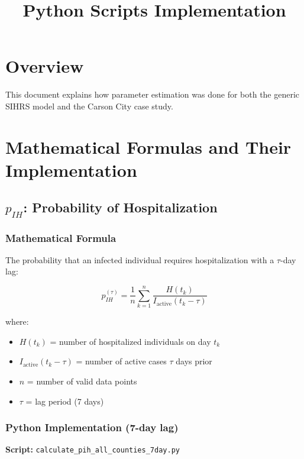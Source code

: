 \documentclass[11pt]{article}
\title{Python Scripts Implementation}
\author{}
\date{}
\begin{document}
\maketitle

\section{Overview}

This document explains how parameter estimation was done for both the generic SIHRS model and the Carson City case study.

\section{Mathematical Formulas and Their Implementation}

\subsection{$p_{IH}$: Probability of Hospitalization}

\subsubsection{Mathematical Formula}
The probability that an infected individual requires hospitalization with a $\tau$-day lag:

\[
p_{IH}^{(\tau)} = \frac{1}{n} \sum_{k=1}^{n} \frac{H(t_k)}{I_{\text{active}}(t_k - \tau)}
\]

where:
\begin{itemize}
    \item $H(t_k)$ = number of hospitalized individuals on day $t_k$
    \item $I_{\text{active}}(t_k - \tau)$ = number of active cases $\tau$ days prior
    \item $n$ = number of valid data points
    \item $\tau$ = lag period (7 days)
\end{itemize}

\subsubsection{Python Implementation (7-day lag)}
\textbf{Script:} \texttt{calculate\_pih\_all\_counties\_7day.py}
\end{document}
